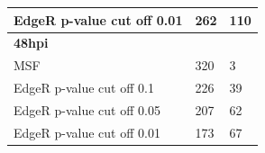 \documentclass[10pt,a4paper,twocolumn]{article}
\begin{document}
\begin{table}[]
\begin{tabular}{lll}
		\multicolumn{1}{|l|}{EdgeR p-value cut off 0.01} & \multicolumn{1}{l|}{262}                                             & \multicolumn{1}{l|}{110}   \\ \hline
		\multicolumn{1}{|l|}{\textbf{48hpi}}             & \multicolumn{1}{l|}{}                                                & \multicolumn{1}{l|}{}                                                  \\ \hline
		\multicolumn{1}{|l|}{MSF}                        & \multicolumn{1}{l|}{320}                                             & \multicolumn{1}{l|}{3}                                                 \\ \hline
		\multicolumn{1}{|l|}{EdgeR p-value cut off 0.1}  & \multicolumn{1}{l|}{226}                                             & \multicolumn{1}{l|}{39}              \\ \hline
		\multicolumn{1}{|l|}{EdgeR p-value cut off 0.05} & \multicolumn{1}{l|}{207}                                             & \multicolumn{1}{l|}{62}   \\ \hline
		\multicolumn{1}{|l|}{EdgeR p-value cut off 0.01} & \multicolumn{1}{l|}{173}                                             & \multicolumn{1}{l|}{67}                       \\ \hline                                                                      
	\end{tabular}
\end{table}
\end{document}
